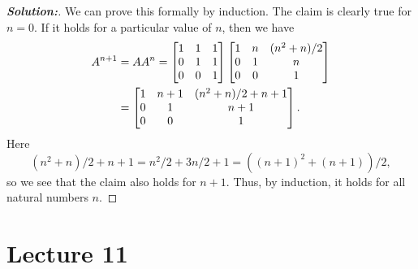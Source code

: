 \documentclass[a4paper]{amsart}
\theoremstyle{definition}
\newenvironment{solution}{\begin{proof}[\textbf{Solution:}] \vphantom{u}}{\end{proof}}
\begin{document}
\begin{solution}
 We can prove this formally by induction.  The claim is clearly true
 for $n=0$.  If it holds for a particular value of $n$, then we have 
 \begin{align*}
  A^{n+1}
   &= AA^n 
    = \left[\begin{matrix} 1&1&1 \\ 0&1&1 \\ 0&0&1 \end{matrix}\right]
      \left[\begin{matrix} 1 & n & (n^2+n)/2 \\ 0 & 1 & n \\ 0 & 0 & 1 \end{matrix}\right] \\
   &= \left[\begin{matrix} 1 & n+1 & (n^2+n)/2 + n + 1 \\ 0 & 1 & n+1 \\ 0 & 0 & 1 \end{matrix}\right].
 \end{align*}
 Here 
 \[ (n^2+n)/2 + n + 1 = n^2/2 + 3n/2 + 1 = ((n+1)^2+(n+1))/2, \]
 so we see that the claim also holds for $n+1$.  Thus, by induction,
 it holds for all natural numbers $n$.
\end{solution}

\section{Lecture 11}
\end{document}
